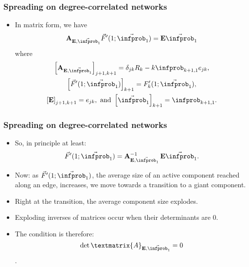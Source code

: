 \begin{frame}
  \frametitle{Spreading on degree-correlated networks}

  \begin{itemize}
  \item<1->
    In matrix form, we have
    $$
    \mathbf{A}_{\mathbf{E},\vec{\infprob}_1 }
    \vec{F}'(1;\vec{\infprob}_1)
    =
    \mathbf{E} \vec{\infprob}_1
    $$
    where 
    \begin{gather}
      \nonumber
      \left[ \mathbf{A}_{\mathbf{E},\vec{\infprob}_1 } \right]_{j+1,k+1}
      = 
      \delta_{jk} R_{k} 
      -
      k \infprob_{k+1,1} e_{jk},
      \\
      \nonumber
      \left[ \vec{F}'(1;\vec{\infprob}_1)  \right]_{k+1}
      = 
      F_{k}'(1;\vec{\infprob}_1),
      \\
      \nonumber
      \left[ \mathbf{E} \right]_{j+1,k+1}
      = 
      e_{jk},
      \
      \mbox{and} \  \left[ \vec{\infprob}_1 \right]_{k+1}
      =
      \infprob_{k+1,1}.
    \end{gather}
  \end{itemize}
\end{frame}

\begin{frame}
  \frametitle{Spreading on degree-correlated networks}

  \begin{itemize}
  \item<1->
    So, in principle at least:
    $$
    \vec{F}'(1;\vec{\infprob}_1)
    =
    \mathbf{A}_{\mathbf{E},\vec{\infprob}_1 }^{-1}
    \, \mathbf{E} \vec{\infprob}_1.
    $$
  \item<2->
    Now: as $\vec{F}'(1;\vec{\infprob}_1)$, 
    the average size of an active component
    reached along an edge, increases, we move towards
    a transition to a giant component.
  \item<3->
    Right at the transition, the average component
    size explodes.
  \item<4->
    Exploding inverses of matrices occur
    when their determinants are 0. 
  \item<5->
    The condition is therefore: 
    $$\det{\textmatrix{A}_{\mathbf{E},\vec{\infprob}_1}} = 0$$.
 \end{itemize}

\end{frame}

